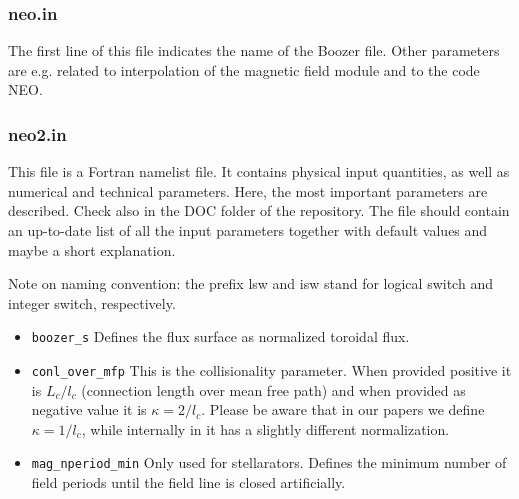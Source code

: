 \documentclass{article}
\newcommand{\vv}[1]{\texttt{\detokenize{#1}}}
\begin{document}
\subsubsection{neo.in\label{running_preparation_neoin}}
The first line of this file indicates the name of the Boozer file. Other
parameters are e.g. related to interpolation of the magnetic field
module and to the code NEO.

\subsubsection{neo2.in\label{running_preparation_neo2in}}
This file is a Fortran namelist file. It contains physical input
quantities, as well as numerical and technical parameters. Here, the
most important parameters are described.
Check also \vv{neo2.in.par-full} in the DOC folder of the \vv{neo-2}
repository. The file should contain an up-to-date list of all the input
parameters together with default values and maybe a short explanation.

Note on naming convention: the prefix lsw and isw stand for logical
switch and integer switch, respectively.

\begin{itemize}
 \item \verb|boozer_s| \newline
 Defines the flux surface as normalized toroidal flux.
 \item \verb|conl_over_mfp|\newline
 This is the collisionality parameter. When provided positive it is
 $L_c/l_c$ (connection length over mean free path) and when provided as
 negative value it is $\kappa = 2/l_c$. Please be aware that in our
 papers we define $\kappa = 1/l_c$, while internally in \vv{neo-2} it has a
 slightly different normalization.
 \item \verb|mag_nperiod_min|\newline
 Only used for stellarators. Defines the minimum number of field periods
 until the field line is closed artificially.
\end{itemize}
\end{document}

